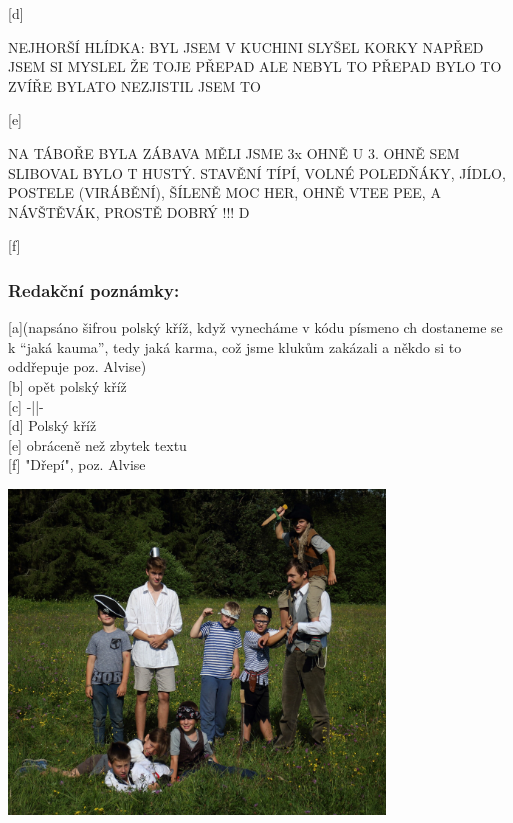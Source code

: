\begin{multicols}{2}
 [d]


NEJHORŠÍ HLÍDKA:
BYL JSEM V KUCHINI SLYŠEL KORKY NAPŘED JSEM SI MYSLEL ŽE TOJE PŘEPAD ALE NEBYL TO PŘEPAD BYLO TO ZVÍŘE BYLATO NEZJISTIL JSEM TO


 [e]


NA TÁBOŘE BYLA ZÁBAVA MĚLI JSME 3x OHNĚ U 3. OHNĚ SEM SLIBOVAL BYLO T HUSTÝ. STAVĚNÍ TÍPÍ, VOLNÉ POLEDŇÁKY, JÍDLO, POSTELE (VIRÁBĚNÍ), ŠÍLENĚ MOC HER, OHNĚ VTEE PEE, A NÁVŠTĚVÁK, PROSTĚ DOBRÝ !!!
D

[f]\\ \vspace{5pt}
\columnbreak


\subsubsection{Redakční poznámky:} %
\label{ssub:pozn}




{[a]}(napsáno šifrou polský kříž, když vynecháme v kódu písmeno ch dostaneme se k “jaká kauma”, tedy jaká karma, což jsme klukům zakázali a někdo si to oddřepuje poz. Alvise) \\
{[b]} opět polský kříž \\
{[c]} -||- \\
{[d]} Polský kříž \\
{[e]} obráceně než zbytek textu \\
{[f]} "Dřepí", poz. Alvise \\



\end{multicols}

\begin{center}
\includegraphics[width=10cm]{img/druziny/kompoti.JPG}
\end{center}

\clearpage
